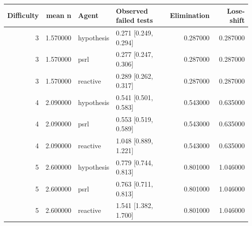 \begin{tabular}{rrllrr}
\toprule
Difficulty & mean n & Agent & Observed failed tests & Elimination & Lose-shift \\
\midrule
3 & 1.570000 & hypothesis & 0.271 [0.249, 0.294] & 0.287000 & 0.287000 \\
3 & 1.570000 & psrl & 0.277 [0.247, 0.306] & 0.287000 & 0.287000 \\
3 & 1.570000 & reactive & 0.289 [0.262, 0.317] & 0.287000 & 0.287000 \\
4 & 2.090000 & hypothesis & 0.541 [0.501, 0.583] & 0.543000 & 0.635000 \\
4 & 2.090000 & psrl & 0.553 [0.519, 0.589] & 0.543000 & 0.635000 \\
4 & 2.090000 & reactive & 1.048 [0.889, 1.221] & 0.543000 & 0.635000 \\
5 & 2.600000 & hypothesis & 0.779 [0.744, 0.813] & 0.801000 & 1.046000 \\
5 & 2.600000 & psrl & 0.763 [0.711, 0.813] & 0.801000 & 1.046000 \\
5 & 2.600000 & reactive & 1.541 [1.382, 1.700] & 0.801000 & 1.046000 \\
\bottomrule
\end{tabular}
